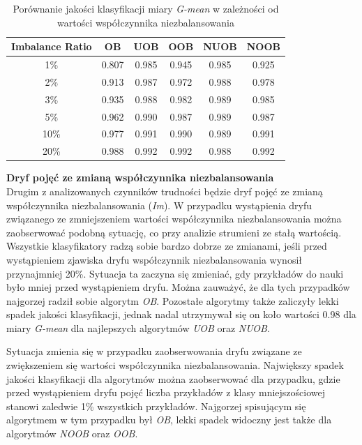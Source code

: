 \newpage

\begin{table}[ht]
\centering\small%
\renewcommand{\arraystretch}{1.5} 
\begin{tabular}{c c c c c c}
\toprule
Imbalance Ratio & OB & UOB & OOB & NUOB & NOOB \\
\midrule
1\% & 0.807 & 0.985 & 0.945 & 0.985 & 0.925 \\
2\% & 0.913 & 0.987 & 0.972 & 0.988 & 0.978 \\
3\% & 0.935 & 0.988 & 0.982 & 0.989 & 0.985 \\
5\% & 0.962 & 0.990 & 0.987 & 0.989 & 0.987 \\
10\% & 0.977 & 0.991 & 0.990 & 0.989 & 0.991 \\
20\% & 0.988 & 0.992 & 0.992 & 0.988 & 0.992 \\
\bottomrule
\end{tabular}
\caption{Porównanie jakości klasyfikacji miary \textit{G-mean} w zależności od wartości współczynnika niezbalansowania}\label{Tab:ImbalanceRatio}
\end{table}

\noindent \textbf{Dryf pojęć ze zmianą współczynnika niezbalansowania}\\

\noindent Drugim z analizowanych czynników trudności będzie dryf pojęć ze zmianą współczynnika niezbalansowania (\textit{Im}). W przypadku wystąpienia dryfu związanego ze zmniejszeniem wartości współczynnika niezbalansowania można zaobserwować podobną sytuację, co przy analizie strumieni ze stałą wartością. Wszystkie klasyfikatory radzą sobie bardzo dobrze ze zmianami, jeśli przed wystąpieniem zjawiska dryfu współczynnik niezbalansowania wynosił przynajmniej 20\%. Sytuacja ta zaczyna się zmieniać, gdy przykładów do nauki było mniej przed wystąpieniem dryfu. Można zauważyć, że dla tych przypadków najgorzej radził sobie algorytm \textit{OB}. Pozostałe algorytmy także zaliczyły lekki spadek jakości klasyfikacji, jednak nadal utrzymywał się on koło wartości 0.98 dla miary \textit{G-mean} dla najlepszych algorytmów \textit{UOB} oraz \textit{NUOB}.

Sytuacja zmienia się w przypadku zaobserwowania dryfu związane ze zwiększeniem się wartości współczynnika niezbalansowania. Największy spadek jakości klasyfikacji dla algorytmów można zaobserwować dla przypadku, gdzie przed wystąpieniem dryfu pojęć liczba przykładów z klasy mniejszościowej stanowi zaledwie 1\% wszystkich przykładów. Najgorzej spisującym się algorytmem w tym przypadku był \textit{OB}, lekki spadek widoczny jest także dla algorytmów \textit{NOOB} oraz \textit{OOB}.

